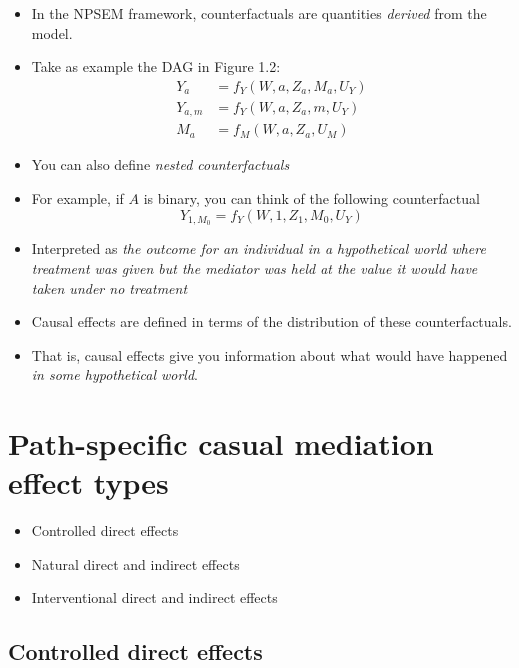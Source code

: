 \documentclass[
  12pt,
]{book}
\providecommand{\tightlist}{%
  \setlength{\itemsep}{0pt}\setlength{\parskip}{0pt}}
\theoremstyle{definition}
\theoremstyle{definition}
\theoremstyle{definition}
\newcommand{\1}{\mathbbm{1}}
\begin{document}
\begin{itemize}
\tightlist
\item
  In the NPSEM framework, counterfactuals are quantities \emph{derived} from the
  model.
\item
  Take as example the DAG in Figure 1.2:
  \begin{align}
    Y_a  &= f_Y(W, a, Z_a, M_a, U_Y)\\
    Y_{a,m}  &= f_Y(W, a, Z_a, m, U_Y)\\
    M_a  &= f_M(W, a, Z_a, U_M)
  \end{align}
\item
  You can also define \emph{nested counterfactuals}
\item
  For example, if \(A\) is binary, you can think of the following counterfactual
  \begin{equation*}
    Y_{1, M_0} = f_Y(W, 1, Z_1, M_0, U_Y)
  \end{equation*}
\item
  Interpreted as \emph{the outcome for an individual in a hypothetical world where
  treatment was given but the mediator was held at the value it would have
  taken under no treatment}
\item
  Causal effects are defined in terms of the distribution of these
  counterfactuals.
\item
  That is, causal effects give you information about what would have happened
  \emph{in some hypothetical world}.
\end{itemize}

\hypertarget{estimands}{%
\chapter{Path-specific casual mediation effect types}\label{estimands}}

\begin{itemize}
\tightlist
\item
  Controlled direct effects
\item
  Natural direct and indirect effects
\item
  Interventional direct and indirect effects
\end{itemize}

\hypertarget{controlled-direct-effects}{%
\section{Controlled direct effects}\label{controlled-direct-effects}}
\end{document}
